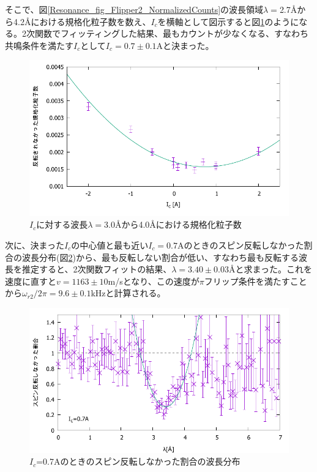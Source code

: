 そこで、図\ref{Resonance_fig_Flipper2_NormalizedCounts}の波長領域$\lambda=$2.7{\AA}から4.2{\AA}における規格化粒子数を数え、$I_c$を横軸として図示すると図\ref{Resonance_fig_Flipper2_Cur}のようになる。2次関数でフィッティングした結果、最もカウントが少なくなる、すなわち共鳴条件を満たす$I_c$として$I_c=0.7\pm0.1$Aと決まった。
\begin{figure}[h]
\centering
\includegraphics[width=12cm]{resonance/analysis/Flipper2_Cur_30-40.pdf}
\caption{$I_c$に対する波長$\lambda=$3.0{\AA}から4.0{\AA}における規格化粒子数}\label{Resonance_fig_Flipper2_Cur}
\end{figure}

次に、決まった$I_c$の中心値と最も近い$I_c=0.7$Aのときのスピン反転しなかった割合の波長分布(図\ref{Resonance_fig_Flipper2_CountsRate_7fit})から、最も反転しない割合が低い、すなわち最も反転する波長を推定すると、2次関数フィットの結果、$\lambda=3.40\pm0.03${\AA}と求まった。これを速度に直すと$v=1163\pm10$m/sとなり、この速度が$\pi$フリップ条件を満たすことから$\omega_{r2}/2\pi=9.6\pm0.1$kHzと計算される。
\begin{figure}[h]
\centering
\includegraphics[width=12cm]{resonance/analysis/Flipper2_CountsRate_7A_fit.pdf}
\caption{$I_c$=0.7Aのときのスピン反転しなかった割合の波長分布}\label{Resonance_fig_Flipper2_CountsRate_7fit}
\end{figure}

